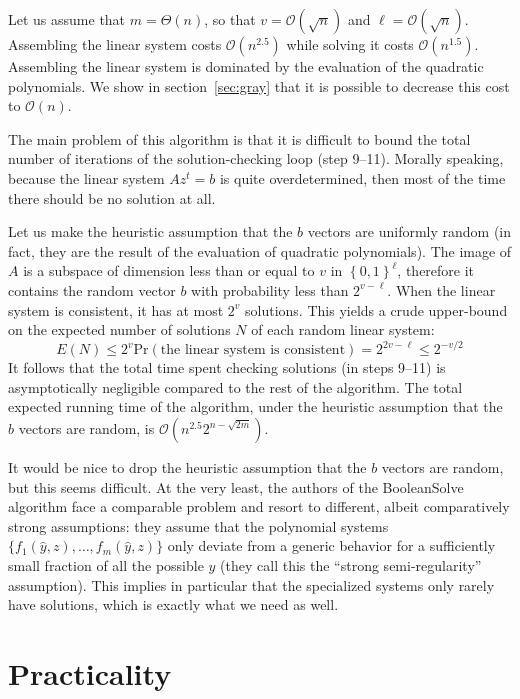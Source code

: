 \documentclass[a4paper,UKenglish,cleveref, autoref]{lipics-v2019}
\newcommand{\bits}{\left\{0, 1\right\}}
\newcommand{\bigO}[1]{\ensuremath{\mathcal{O}\left( #1 \right)} }
\newcommand{\bigTheta}[1]{\ensuremath{\Theta\left( #1 \right)} }
\begin{document}
Let us assume that $m = \bigTheta{n}$, so that $v = \bigO{\sqrt{n}}$ and
$\ell = \bigO{\sqrt{n}}$. Assembling the linear system costs $\bigO{n^{2.5}}$
while solving it costs $\bigO{n^{1.5}}$. Assembling the linear system is
dominated by the evaluation of the quadratic polynomials. We show in
section~\ref{sec:gray} that it is possible to decrease this cost to $\bigO{n}$.

The main problem of this algorithm is that it is difficult to bound the total
number of iterations of the solution-checking loop (step 9--11). Morally
speaking, because the linear system $A z^t = b$ is quite overdetermined, then most
of the time there should be no solution at all.

Let us make the heuristic assumption that the $b$ vectors are uniformly random
(in fact, they are the result of the evaluation of quadratic polynomials). The
image of $A$ is a subspace of dimension less than or equal to $v$ in
$\bits^\ell$, therefore it contains the random vector $b$ with probability less
than $2^{v-\ell}$. When the linear system is consistent, it has at most $2^v$
solutions. This yields a crude upper-bound on the expected number of solutions
$N$ of each random linear system:
\[
E(N) \leq 2^v \mathrm{Pr}(\text{the linear system is consistent}) = 2^{2v - \ell} \leq 2^{-v/2}
\]
It follows that the total time spent checking solutions (in steps 9--11) is
asymptotically negligible compared to the rest of the algorithm.  The total
expected running time of the algorithm, under the heuristic assumption that the
$b$ vectors are random, is $\bigO{n^{2.5} 2^{n - \sqrt{2m}}}$.

It would be nice to drop the heuristic assumption that the $b$ vectors are
random, but this seems difficult. At the very least, the authors of the
\textsf{BooleanSolve} algorithm face a comparable problem and resort to
different, albeit comparatively strong assumptions: they assume that the
polynomial systems $\{f_1(\hat y, z), \dots, f_m(\hat y, z)\}$ only deviate from
a generic behavior for a sufficiently small fraction of all the possible
$\hat y$ (they call this the ``strong semi-regularity'' assumption). This
implies in particular that the specialized systems only rarely have solutions,
which is exactly what we need as well.



\section{Practicality}
\end{document}
